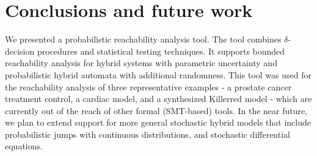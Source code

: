 \section{Conclusions and future work}
We presented a probabilistic reachability analysis tool. The tool combines $\delta$-decision 
procedures \cite{gao2013dreal, gao2013satisfiability, gaodelta} and statistical testing techniques. 
It supports bounded reachability analysis for hybrid systems with parametric 
uncertainty and probabilistic hybrid automata with additional randomness. This tool was used for the reachability analysis of three representative examples - a prostate 
cancer treatment control, a cardiac model, and a synthesized Killerred model - which are currently out of the reach of other formal (SMT-based) tools. In the near future, we plan to extend support for more general stochastic hybrid models 
that include probabilistic jumps with continuous distributions, and stochastic differential equations.
